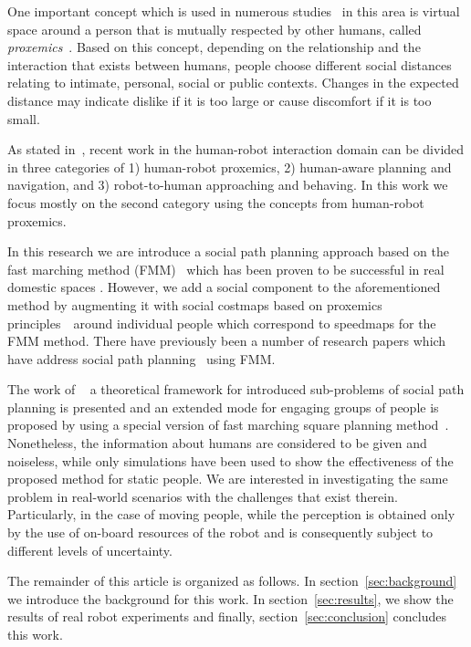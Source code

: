 One important concept which is used in numerous studies~\cite{Mumm2011,Takayama2009,Walters2011,ferrer2013robot} in this area is virtual space around a person that is mutually respected by other humans, called \textit{proxemics}~\cite{Hall1969}.
Based on this concept, depending on the relationship and the interaction that exists between humans, people choose different social distances relating to intimate, personal, social or public contexts.
Changes in the expected distance may indicate dislike if it is too large or cause discomfort if it is too small.



As stated in~\cite{gomez2013social}, recent work in the human-robot interaction domain can be divided in three categories of 1) human-robot proxemics, 2) human-aware planning and navigation, and 3) robot-to-human approaching and behaving. In this work we focus mostly on the second category using the concepts from human-robot proxemics. %

In this research we are introduce a social path planning approach based on the fast marching method (FMM)~\cite{sethian1999fast} which has been proven to be successful in real domestic spaces \cite{ventura2015}. However, we add a social component to the aforementioned method by augmenting it with social costmaps \textemdash based on proxemics principles~\cite{kirby2009companion}\textemdash~around individual people which correspond to speedmaps for the FMM method. There have previously been a number of research papers which have address social path planning~\cite{gomez2014fast,gomez2013social} using FMM. 

The work of ~\cite{gomez2014fast} a theoretical framework for introduced sub-problems of social path planning is presented and an extended mode for engaging groups of people is proposed by using a special version of fast marching square planning method~\cite{valero2013fast}. Nonetheless, the information about humans are considered to be given and noiseless, while only simulations have been used to show the effectiveness of the proposed method for static people. We are interested in investigating the same problem in real-world scenarios with the challenges that exist therein. Particularly, in the case of moving people, while the perception is obtained only by the use of on-board resources of the robot and is consequently subject to different levels of uncertainty.

The remainder of this article is organized as follows. In section~\ref{sec:background} we introduce the background for this work. In section~\ref{sec:results}, we show the results of real robot experiments and finally, section~\ref{sec:conclusion} concludes this work.

